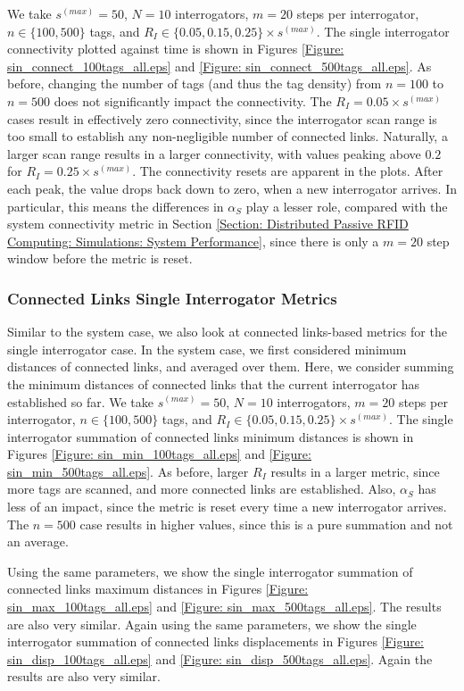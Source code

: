 We take $s^{(max)} = 50$, $N = 10$ interrogators, $m = 20$ steps per interrogator, $n \in \{100, 500\}$ tags, and $R_I \in \{0.05, 0.15, 0.25\} \times s^{(max)}$. The single interrogator connectivity plotted against time is shown in Figures \ref{Figure: sin_connect_100tags_all.eps} and \ref{Figure: sin_connect_500tags_all.eps}. As before, changing the number of tags (and thus the tag density) from $n = 100$ to $n = 500$ does not significantly impact the connectivity. The $R_I = 0.05 \times s^{(max)}$ cases result in effectively zero connectivity, since the interrogator scan range is too small to establish any non-negligible number of connected links. Naturally, a larger scan range results in a larger connectivity, with values peaking above $0.2$ for $R_I = 0.25 \times s^{(max)}$. The connectivity resets are apparent in the plots. After each peak, the value drops back down to zero, when a new interrogator arrives. In particular, this means the differences in $\alpha_S$ play a lesser role, compared with the system connectivity metric in Section \ref{Section: Distributed Passive RFID Computing: Simulations: System Performance}, since there is only a $m = 20$ step window before the metric is reset.

\subsubsection{\textbf{Connected Links Single Interrogator Metrics}}
Similar to the system case, we also look at connected links-based metrics for the single interrogator case. In the system case, we first considered minimum distances of connected links, and averaged over them. Here, we consider summing the minimum distances of connected links that the current interrogator has established so far. We take $s^{(max)} = 50$, $N = 10$ interrogators, $m = 20$ steps per interrogator, $n \in \{100, 500\}$ tags, and $R_I \in \{0.05, 0.15, 0.25\} \times s^{(max)}$. The single interrogator summation of connected links minimum distances is shown in Figures \ref{Figure: sin_min_100tags_all.eps} and \ref{Figure: sin_min_500tags_all.eps}. As before, larger $R_I$ results in a larger metric, since more tags are scanned, and more connected links are established. Also, $\alpha_S$ has less of an impact, since the metric is reset every time a new interrogator arrives. The $n = 500$ case results in higher values, since this is a pure summation and not an average.

Using the same parameters, we show the single interrogator summation of connected links maximum distances in Figures \ref{Figure: sin_max_100tags_all.eps} and \ref{Figure: sin_max_500tags_all.eps}. The results are also very similar. Again using the same parameters, we show the single interrogator summation of connected links displacements in Figures \ref{Figure: sin_disp_100tags_all.eps} and \ref{Figure: sin_disp_500tags_all.eps}. Again the results are also very similar.

